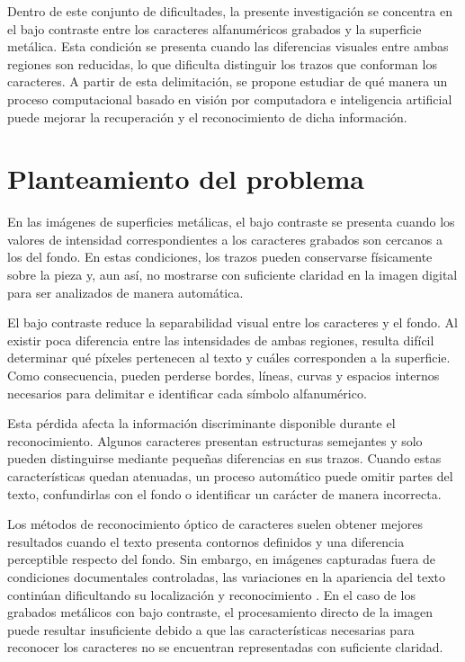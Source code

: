 Dentro de este conjunto de dificultades, la presente investigación se concentra en el bajo contraste entre los caracteres alfanuméricos grabados y la superficie metálica. Esta condición se presenta cuando las diferencias visuales entre ambas regiones son reducidas, lo que dificulta distinguir los trazos que conforman los caracteres. A partir de esta delimitación, se propone estudiar de qué manera un proceso computacional basado en visión por computadora e inteligencia artificial puede mejorar la recuperación y el reconocimiento de dicha información.

\section{Planteamiento del problema}
\label{sec:planteamiento_problema}

En las imágenes de superficies metálicas, el bajo contraste se presenta cuando los valores de intensidad correspondientes a los caracteres grabados son cercanos a los del fondo. En estas condiciones, los trazos pueden conservarse físicamente sobre la pieza y, aun así, no mostrarse con suficiente claridad en la imagen digital para ser analizados de manera automática.

El bajo contraste reduce la separabilidad visual entre los caracteres y el fondo. Al existir poca diferencia entre las intensidades de ambas regiones, resulta difícil determinar qué píxeles pertenecen al texto y cuáles corresponden a la superficie. Como consecuencia, pueden perderse bordes, líneas, curvas y espacios internos necesarios para delimitar e identificar cada símbolo alfanumérico.

Esta pérdida afecta la información discriminante disponible durante el reconocimiento. Algunos caracteres presentan estructuras semejantes y solo pueden distinguirse mediante pequeñas diferencias en sus trazos. Cuando estas características quedan atenuadas, un proceso automático puede omitir partes del texto, confundirlas con el fondo o identificar un carácter de manera incorrecta.

Los métodos de reconocimiento óptico de caracteres suelen obtener mejores resultados cuando el texto presenta contornos definidos y una diferencia perceptible respecto del fondo. Sin embargo, en imágenes capturadas fuera de condiciones documentales controladas, las variaciones en la apariencia del texto continúan dificultando su localización y reconocimiento \parencite{Pal2024}. En el caso de los grabados metálicos con bajo contraste, el procesamiento directo de la imagen puede resultar insuficiente debido a que las características necesarias para reconocer los caracteres no se encuentran representadas con suficiente claridad.


